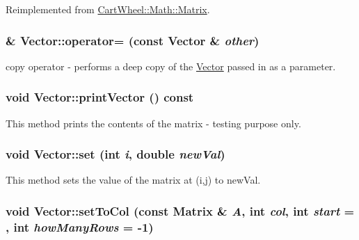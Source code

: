 Reimplemented from \hyperlink{classCartWheel_1_1Math_1_1Matrix_a3e40db12ae78b7616ee3f099bb15f13d}{CartWheel::Math::Matrix}.

\hypertarget{classCartWheel_1_1Math_1_1Vector_a31810b59e0d9106aa17ecf6ae1cfbaf1}{
\subsubsection[{operator=}]{ \& Vector::operator= (const {\bf Vector} \& {\em other})}}
\label{classCartWheel_1_1Math_1_1Vector_a31810b59e0d9106aa17ecf6ae1cfbaf1}
copy operator -\/ performs a deep copy of the \hyperlink{classCartWheel_1_1Math_1_1Vector}{Vector} passed in as a parameter. \hypertarget{classCartWheel_1_1Math_1_1Vector_a1e60f4c06eaee149416365e2a85bc150}{
\subsubsection[{printVector}]{\setlength{\rightskip}{0pt plus 5cm}void Vector::printVector () const}}
\label{classCartWheel_1_1Math_1_1Vector_a1e60f4c06eaee149416365e2a85bc150}
This method prints the contents of the matrix -\/ testing purpose only. \hypertarget{classCartWheel_1_1Math_1_1Vector_abb08d9034a1ae962d4bedff66799bf3b}{
\subsubsection[{set}]{\setlength{\rightskip}{0pt plus 5cm}void Vector::set (int {\em i}, \/  double {\em newVal})}}
\label{classCartWheel_1_1Math_1_1Vector_abb08d9034a1ae962d4bedff66799bf3b}
This method sets the value of the matrix at (i,j) to newVal. \hypertarget{classCartWheel_1_1Math_1_1Vector_ae98317a1a169070e52436ed4b6c62c5c}{
\subsubsection[{setToCol}]{\setlength{\rightskip}{0pt plus 5cm}void Vector::setToCol (const {\bf Matrix} \& {\em A}, \/  int {\em col}, \/  int {\em start} = {}, \/  int {\em howManyRows} = {\ttfamily -\/1})}}
